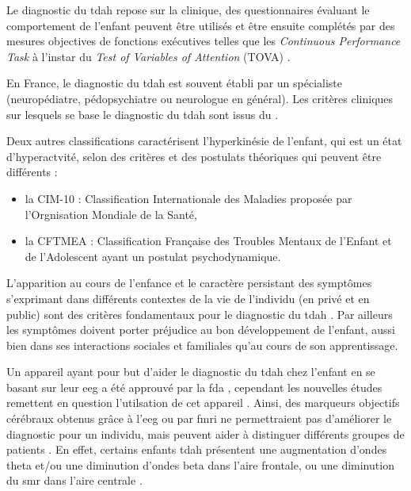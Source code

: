 Le diagnostic du \gls{tdah} repose sur la clinique, des questionnaires évaluant le comportement de l'enfant peuvent être utilisés et être ensuite 
complétés par des mesures objectives de fonctions exécutives telles que les \textit{Continuous Performance Task} \citep{Barkley1991} à l'instar du 
\textit{Test of Variables of Attention} (TOVA) \citep{Forbes1998}.

En France, le diagnostic du \gls{tdah} est souvent établi par un spécialiste (neuropédiatre, pédopsychiatre ou neurologue en général).
Les critères cliniques sur lesquels se base le diagnostic du \gls{tdah} sont issus du \citet{DSM-5}.

Deux autres classifications caractérisent l'hyperkinésie de l'enfant, qui est un état d'hyperactvité, selon des critères et des postulats théoriques 
qui peuvent être différents : 
\begin{itemize}
\item la CIM-10 : Classification Internationale des Maladies proposée par l'Orgnisation Mondiale de la Santé,
\item la CFTMEA : Classification Française des Troubles Mentaux de l'Enfant et de l'Adolescent ayant un postulat psychodynamique.
\end{itemize}

L'apparition au cours de l'enfance et le caractère persistant des symptômes s'exprimant dans différents contextes de la vie de l'individu (en privé et 
en public) sont des critères fondamentaux pour le diagnostic du \gls{tdah} \citep{HAS}. Par ailleurs les symptômes doivent porter préjudice au bon 
développement de l'enfant, aussi bien dans ses interactions sociales et familiales qu'au cours de son apprentissage. 

Un appareil ayant pour but d'aider le diagnostic du \gls{tdah} chez l'enfant en se basant sur leur \gls{eeg} 
a été approuvé par la \gls{fda} \citep{FDA, NebaHealth}, cependant les nouvelles études remettent en question l'utilsation de cet appareil \citep{Arns2013, 
Zhang2017}. Ainsi, des marqueurs objectifs cérébraux obtenus grâce à l'\gls{eeg} ou par \gls{fmri} ne permettraient pas d'améliorer le diagnostic pour un individu, mais
peuvent aider à distinguer différents groupes de patients \citep{Johnstone2005, Zhang2017, Clarke2011}. En effet, certains enfants \gls{tdah} 
présentent une augmentation d'ondes theta et/ou une diminution d'ondes beta dans l'aire frontale, ou une diminution du \gls{smr} dans l'aire centrale
\citep{Monastra2005, Janzen1995, Loo2018}. 

